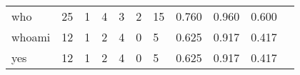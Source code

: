 \begin{longtable}{lp{1.20cm}p{1.20cm}p{1.20cm}p{1.20cm}p{1.20cm}p{1.20cm}p{1.20cm}p{1.20cm}p{1.20cm}p{1.20cm}}
who       &                                    25 &                                                  1 &                                                  4 &                                                  3 &                                                  2 &                                                 15 &                                         0.760 &                                              0.960 &                                              0.600 \\
whoami    &                                    12 &                                                  1 &                                                  2 &                                                  4 &                                                  0 &                                                  5 &                                         0.625 &                                              0.917 &                                              0.417 \\
yes       &                                    12 &                                                  1 &                                                  2 &                                                  4 &                                                  0 &                                                  5 &                                         0.625 &                                              0.917 &                                              0.417 \\
\end{longtable}
